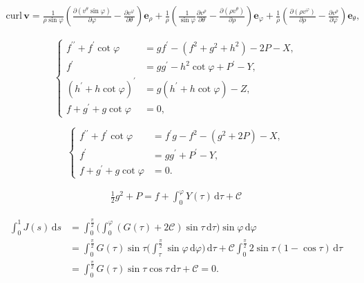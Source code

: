 \documentclass[10pt,a4paper]{amsart}
\newcommand{\Be}{{\boldsymbol{e}}}
\newcommand{\Bv}{{\boldsymbol{v}}}
\newcommand{\curl}{\mathrm{curl}}
\newcommand{\mcC}{\mathcal{C}}
\newcommand{\p}{\partial}
\newcommand{\te}{\theta}
\newcommand{\vp}{\varphi}
\begin{document}
\begin{equation}\label{eqn:sphericalcurl}
\begin{aligned}
\curl \, \Bv=
\frac{1}{\rho\sin\vp}
\left(
\frac{\p(v^{\te}\sin\vp)}{\p\vp}-\frac{\p v^{\vp}}{\p\te}
\right)
\Be_{\rho}
+\frac{1}{\rho}
\left(\frac{1}{\sin\vp}\frac{\p v^{\rho}}{\p\te}-\frac{\p(\rho v^{\te})}{\p\rho}\right)\Be_{\vp}
+\frac{1}{\rho}
\left(\frac{\p(\rho v^{\vp})}{\p\rho}-\frac{\p v^{\rho}}{\p\vp}\right)\Be_{\te},  
\end{aligned}
\end{equation}

\begin{equation}\label{eqn:halfD1}
\left\{
\begin{aligned}
   f^{\prime\prime} + f^{\prime} \cot \varphi &= gf^{\prime} -(f^2 + g^2 + h^2) - 2P - X, \\
   f^{\prime} &= gg^{\prime} - h^2 \cot \varphi + P^{\prime} - Y, \\ 
   (h^\prime + h\cot \varphi)^{\prime} &= g(h^\prime + h\cot \varphi) - Z,\\
   f+ g^\prime + g\cot \varphi &=0,
\end{aligned}
\right.
\end{equation}

\begin{equation}\label{eqn:halfD2}
\left\{ 
\begin{aligned}
    f^{\prime \prime} + f^\prime \cot \varphi &= f^\prime g - f^2 - ( g^2+2P) -X,\\
    f^\prime &= g g^\prime + P^\prime - Y, \\
    f+ g^\prime + g\cot \varphi &=0. 
\end{aligned}
\right.
\end{equation}

\begin{align}\label{eqn:eqnforP}
\frac12 g^2 + P = f + \int_0^{\varphi} Y(\tau)\,\mathrm{d}\tau + \mcC
\end{align}

\begin{equation}\label{eqn:constC}
\begin{aligned}
\int_0^1 J(s) \, \mathrm{d} s 
&= \int_0^{\frac{\pi}{2}} \biggl(\int_0^{\varphi} (G(\tau) +2 \mcC) \sin\tau \, \mathrm{d}\tau \biggr) \sin\varphi \, \mathrm{d}\varphi\\
&= \int_0^{\frac{\pi}{2}} G(\tau) \sin\tau \biggl(\int_{\tau}^{\frac{\pi}{2}}
\sin\varphi \, \mathrm{d}\varphi \biggr) \, \mathrm{d}\tau + \mcC \int_0^{\frac{\pi}{2}} 2\sin\tau(1-\cos\tau)\,\mathrm{d}\tau\\
&= \int_0^{\frac{\pi}{2}} G(\tau) \sin\tau \cos\tau \, \mathrm{d}\tau + \mcC = 0.
\end{aligned}
\end{equation}
\end{document}
